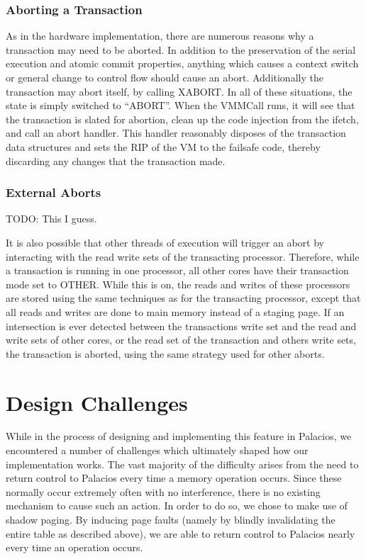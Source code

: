 \documentclass{acm_proc_article-sp}
\begin{document}
\subsubsection{Aborting a Transaction}

As in the hardware implementation, there are numerous reasons why a transaction
may need to be aborted. In addition to the preservation of the serial execution
and atomic commit properties, anything which causes a context switch or general
change to control flow should cause an abort. Additionally the transaction may
abort itself, by calling XABORT. In all of these situations, the state is 
simply switched to ``ABORT''. When the VMMCall runs, it will see that the 
transaction is slated for abortion, clean up the code injection from the ifetch,
and call an abort handler. This handler reasonably disposes of the transaction
data structures and sets the RIP of the VM to the failsafe code, thereby
discarding any changes that the transaction made. 

\subsubsection{External Aborts}

TODO: This I guess.

It is also possible that other threads of execution will trigger an abort by
interacting with the read write sets of the transacting processor. Therefore,
while a transaction is running in one processor, all other cores have their
transaction mode set to OTHER. While this is on, the reads and writes of these
processors are stored using the same techniques as for the transacting
processor, except that all reads and writes are done to main memory instead of
a staging page. If an intersection is ever detected between the transactions
write set and the read and write sets of other cores, or the read set of the
transaction and others write sets, the transaction is aborted, using the same
strategy used for other aborts.  


\section{Design Challenges}

While in the process of designing and implementing this feature in Palacios, we
encountered a number of challenges which ultimately shaped how our implementation
works. The vast majority of the difficulty arises from the need to return
control to Palacios every time a memory operation occurs. Since these normally
occur extremely often with no interference, there is no existing mechanism to 
cause such an action. In order to do so, we chose to make use of shadow paging.
By inducing page faults (namely by blindly invalidating the entire table as
described above), we are able to return control to Palacios nearly every time
an operation occurs.
\end{document}
